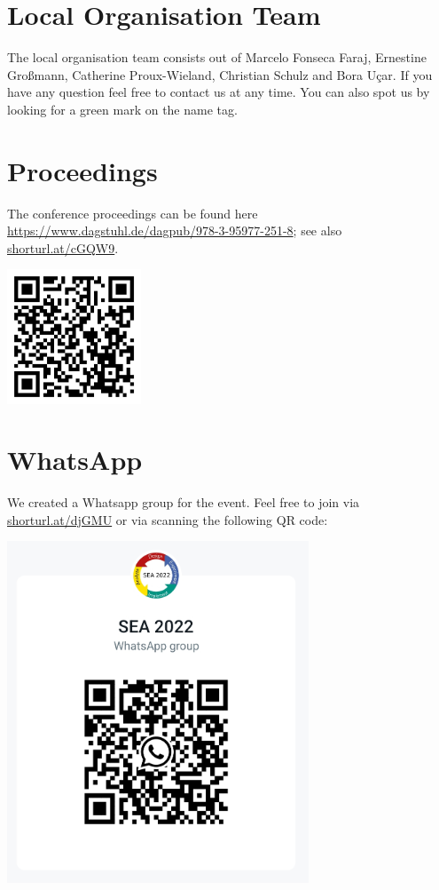 \documentclass{article}
\begin{document}
\section{Local Organisation Team}
The local organisation team consists out of Marcelo Fonseca Faraj, Ernestine Großmann, Catherine Proux-Wieland, Christian Schulz and Bora Uçar. If you have any question feel free to contact us at any time. You can also spot us by looking for a green mark on the name tag.

\section{Proceedings}
The conference proceedings can be found here \url{https://www.dagstuhl.de/dagpub/978-3-95977-251-8}; see also \url{shorturl.at/cGQW9}.
\begin{center}
        \includegraphics[width=4cm]{qr-code_proceedings.png}
\end{center}

\vfill
\pagebreak
\section{WhatsApp}
We created a Whatsapp group for the event. Feel free to join via \url{shorturl.at/djGMU} or via scanning the following QR code:
\vspace*{1cm}

\begin{center}
        \includegraphics[width=9cm]{whatsapp.jpg}
\end{center}
\vfill
\pagebreak
\end{document}
